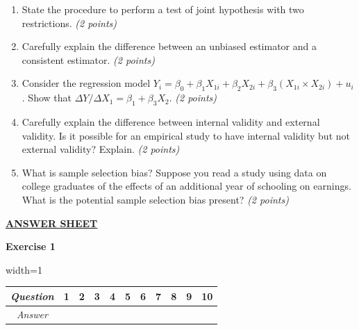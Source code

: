 \documentclass{article}
\begin{document}
\begin{enumerate}[label=\alph*)]

\item State the procedure to perform a test of joint hypothesis with two restrictions. \textit{(2 points)}%
\item Carefully explain the difference between an unbiased estimator and a consistent estimator. \textit{(2 points)}%
\item Consider the regression model $Y_i = \beta_0 + \beta_1X_{1i} + \beta_2 X_{2i} + \beta_3 (X_{1i} \times X_{2i}) + u_i$. Show that $\Delta Y/ \Delta X_1 = \beta_1 + \beta_3 X_2$. \textit{(2 points)}%
\item  Carefully explain the difference between internal validity and external validity. Is it possible for an empirical study to have internal validity but not external validity? Explain. \textit{(2 points)} %
\item What is sample selection bias? Suppose you read a study using data on college graduates of the effects of an additional year of schooling on earnings. What is the potential sample selection bias present? \textit{(2 points)} %

\end{enumerate}


\newpage
{}

\begin{center}
    \textbf{\Large \underline{ANSWER SHEET}}
\end{center}
\vspace{1cm}

\textbf{Exercise 1}\vspace{.25cm}
\begin{table}[hp!]
\centering
\begin{adjustbox}{width=1\textwidth}
\begin{tabular}{|c|c|c|c|c|c|c|c|c|c|c|}
\hline
\rowcolor[HTML]{EFEFEF} 
\textit{Question} & 1 & 2 & 3 & 4 & 5 & 6 & 7 & 8 & 9 & 10 \\ \hline
\textit{Answer}   &   &   &   &   &   &   &   &   &   &    \\ \hline
\end{tabular}
\end{adjustbox}
\end{table}
\vspace{1cm}
\end{document}
